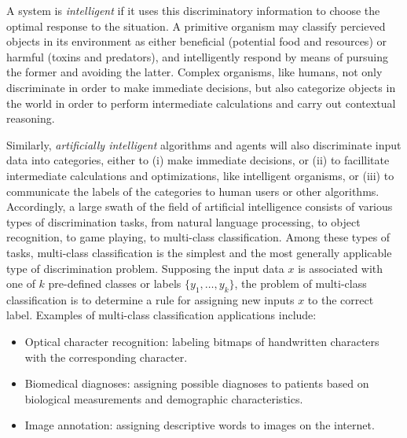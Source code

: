 A system is \emph{intelligent} if it uses this discriminatory
information to choose the optimal response to the situation.  A
primitive organism may classify percieved objects in its environment
as either beneficial (potential food and resources) or harmful (toxins
and predators), and intelligently respond by means of pursuing the
former and avoiding the latter.  Complex organisms, like humans, not
only discriminate in order to make immediate decisions, but also
categorize objects in the world in order to perform intermediate
calculations and carry out contextual reasoning.  


Similarly, \emph{artificially intelligent} algorithms and agents will
also discriminate input data into categories, either to (i) make
immediate decisions, or (ii) to facillitate intermediate calculations
and optimizations, like intelligent organisms, or (iii) to communicate
the labels of the categories to human users or other algorithms.
Accordingly, a large swath of the field of artificial intelligence
consists of various types of discrimination tasks, from natural
language processing, to object recognition, to game playing, to
multi-class classification.  Among these types of tasks, multi-class
classification is the simplest and the most generally applicable
type of discrimination problem.  Supposing the input data $x$ is
associated with one of $k$ pre-defined classes or labels
$\{y_1,\hdots, y_k\}$, the problem of multi-class classification is to
determine a rule for assigning new inputs $x$ to the correct label.
Examples of multi-class classification applications include:
\begin{itemize}
\item Optical character recognition: labeling bitmaps of handwritten characters with the corresponding character.
\item Biomedical diagnoses: assigning possible diagnoses to patients based on biological measurements and demographic characteristics.
\item Image annotation: assigning descriptive words to images on the internet.
\end{itemize}

